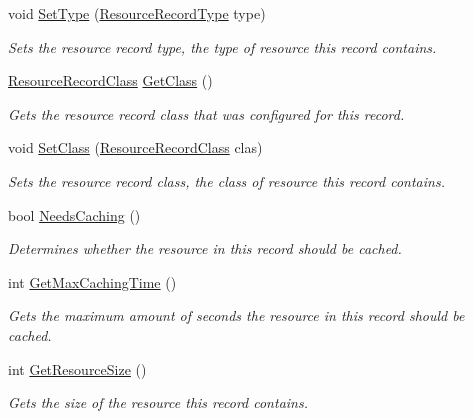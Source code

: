 \begin{DoxyCompactItemize}
void \hyperlink{class_senergy_1_1_dns_1_1_resource_record_ac339b08bf936f1971de6b24b46dd5813}{Set\-Type} (\hyperlink{namespace_senergy_1_1_dns_a590bfd748c955364770f5ce358d9dfe0}{Resource\-Record\-Type} type)
\begin{DoxyCompactList}\small\item\em Sets the resource record type, the type of resource this record contains. \end{DoxyCompactList}\item 
\hyperlink{namespace_senergy_1_1_dns_a953f153bc411213d621d00c1e1b3eb9d}{Resource\-Record\-Class} \hyperlink{class_senergy_1_1_dns_1_1_resource_record_a5b26da86b8ba4d6c0899dc56a9fee7c1}{Get\-Class} ()
\begin{DoxyCompactList}\small\item\em Gets the resource record class that was configured for this record. \end{DoxyCompactList}\item 
void \hyperlink{class_senergy_1_1_dns_1_1_resource_record_a4fca01c4e494f21c574e5c2bc382f3a3}{Set\-Class} (\hyperlink{namespace_senergy_1_1_dns_a953f153bc411213d621d00c1e1b3eb9d}{Resource\-Record\-Class} clas)
\begin{DoxyCompactList}\small\item\em Sets the resource record class, the class of resource this record contains. \end{DoxyCompactList}\item 
bool \hyperlink{class_senergy_1_1_dns_1_1_resource_record_ab90850f8b050337867261a55a2e43284}{Needs\-Caching} ()
\begin{DoxyCompactList}\small\item\em Determines whether the resource in this record should be cached. \end{DoxyCompactList}\item 
int \hyperlink{class_senergy_1_1_dns_1_1_resource_record_ab391deab6827e4e772809a3d025abb31}{Get\-Max\-Caching\-Time} ()
\begin{DoxyCompactList}\small\item\em Gets the maximum amount of seconds the resource in this record should be cached. \end{DoxyCompactList}\item 
int \hyperlink{class_senergy_1_1_dns_1_1_resource_record_affea007cc6d81a8a2dd80148c3386c62}{Get\-Resource\-Size} ()
\begin{DoxyCompactList}\small\item\em Gets the size of the resource this record contains. \end{DoxyCompactList}\end{DoxyCompactItemize}
